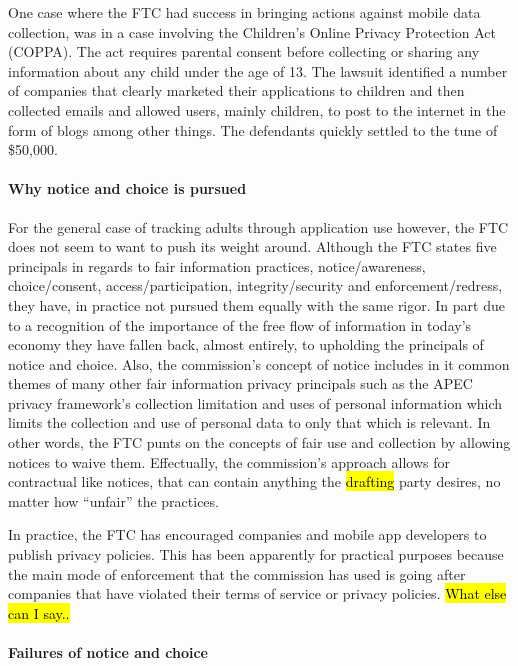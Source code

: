 One case where the FTC had success in bringing actions against mobile data collection, was in a case involving the Children's Online Privacy Protection Act (COPPA). The act requires parental consent before collecting or sharing any information about any child under the age of 13. The lawsuit identified a number of companies that clearly marketed their applications to children and then collected emails and allowed users, mainly children, to post to the internet in the form of blogs among other things\cite{ftc2011}. The defendants quickly settled to the tune of \$50,000. 


		\paragraph{Why notice and choice is pursued}

For the general case of tracking adults through application use however, the FTC does not seem to want to push its weight around. 
Although the FTC states five principals in regards to fair information practices, notice/awareness, choice/consent, access/participation, integrity/security and enforcement/redress, they have, in practice not pursued them equally with the same rigor.
In part due to a recognition of the importance of the free flow of information in today's economy\cite{56} they have fallen back, almost entirely, to upholding the principals of notice and choice. 
Also, the commission's concept of notice includes in it common themes of many other fair information privacy principals such as the APEC privacy framework's collection limitation and uses of personal information which limits the collection and use of personal data to only that which is relevant\cite{apec}. 
In other words, the FTC punts on the concepts of fair use and collection by allowing notices to waive them. 
Effectually, the commission's approach allows for contractual like notices, that can contain anything the \hl{drafting} party desires, no matter how ``unfair'' the practices\cite{fair}. 

In practice, the FTC has encouraged companies and mobile app developers to publish privacy policies. This has been apparently for practical purposes because the main mode of enforcement that the commission has used is going after companies that have violated their terms of service or privacy policies. 
\hl{What else can I say..}

		\paragraph{Failures of notice and choice}

